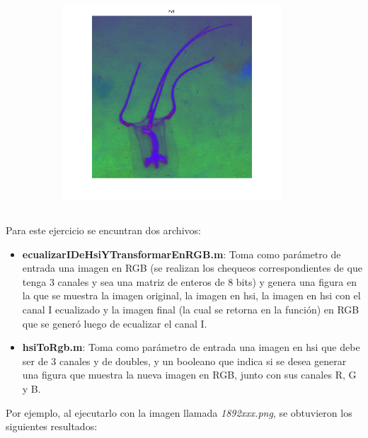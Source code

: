 \documentclass{article}
\begin{document}
\begin{figure}[H]
\begin{subfigure}{0.5\textwidth}
        \includegraphics[width=0.9\textwidth]{1901-hsi.png}
    \end{subfigure}\hfill
\end{figure}

\subsection{}

Para este ejercicio se encuntran dos archivos:
\begin{itemize}
\item \textbf{ecualizarIDeHsiYTransformarEnRGB.m}: Toma como parámetro de entrada una imagen en RGB (se realizan los chequeos correspondientes de que tenga 3 canales y sea una matriz de enteros de 8 bits) y 
genera una figura en la que se muestra la imagen original, la imagen en hsi, la imagen en hsi con el canal I ecualizado y la imagen final (la cual se retorna en la función) en RGB que se generó luego de ecualizar el canal I.
\item \textbf{hsiToRgb.m}: Toma como parámetro de entrada una imagen en hsi que debe ser de 3 canales y de doubles, y un booleano que indica si se desea generar una figura que muestra la nueva imagen en RGB, junto con sus canales R, G y B.
\end{itemize}

Por ejemplo, al ejecutarlo con la imagen llamada \textit{1892xxx.png}, se obtuvieron los siguientes resultados:
\end{document}
